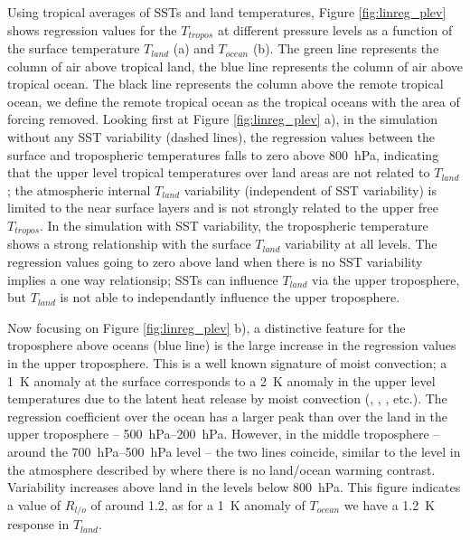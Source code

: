 Using tropical averages of SSTs and land temperatures, Figure 
\ref{fig:linreg_plev} shows regression values for the $T_{tropos}$ at different 
pressure levels as a function of the surface temperature $T_{land}$ (a) and 
$T_{ocean}$ (b). The green line represents the column of air above tropical 
land, the blue line represents the column of air above tropical ocean. The black 
line represents the column above the remote tropical ocean, we define the remote 
tropical ocean as the tropical oceans with the area of forcing removed.  Looking 
first at Figure \ref{fig:linreg_plev} a), in the simulation without any SST 
variability (dashed lines), the regression values between the surface and 
tropospheric temperatures falls to zero above \SI{800}{\hecto\pascal}, 
indicating that the upper level tropical temperatures over land areas are not 
related to $T_{land}$; the atmospheric internal $T_{land}$ variability 
(independent of SST variability) is limited to the near surface layers and is 
not strongly related to the upper free $T_{tropos}$. In the simulation with SST 
variability, the tropospheric temperature shows a strong relationship with the 
surface $T_{land}$ variability at all levels. The regression values going to 
zero above land when there is no SST variability implies a one way relationsip; 
SSTs can influence $T_{land}$ via the upper troposphere, but $T_{land}$ is not 
able to independantly influence the upper troposphere.

Now focusing on Figure \ref{fig:linreg_plev} b), a distinctive feature for the 
troposphere above oceans (blue line) is the large increase in the regression 
values in the upper troposphere. This is a well known signature of moist
convection; a \SI{1}{\kelvin} anomaly at the surface corresponds to a 
\SI{2}{\kelvin} anomaly in the upper level temperatures due to the latent heat 
release by moist convection (\citet{Joshi2007}, \citet{Byrne2013}, 
\citet{Dommenget2009}, etc.). The regression coefficient over the ocean has a 
larger peak than over the land in the upper troposphere --  
\SIrange{500}{200}{\hecto\pascal}.  However, in the middle troposphere -- around 
the \SIrange{700}{500}{\hecto\pascal} level -- the two lines coincide, similar 
to the level in the atmosphere described by \citet{Joshi2007} where there is no 
land/ocean warming contrast. Variability increases above land in the levels 
below \SI{800}{\hecto\pascal}.  This figure indicates a value of $R_{l/o}$ of 
around 1.2, as for a \SI{1}{\kelvin} anomaly of $T_{ocean}$ we have a 
\SI{1.2}{\kelvin} response in $T_{land}$.  

